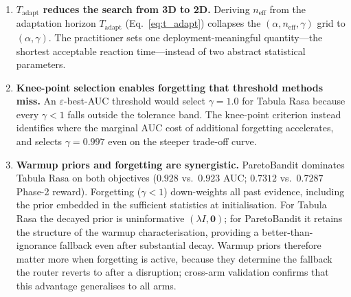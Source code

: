 \begin{enumerate}[nosep,leftmargin=*]
  \item \textbf{$T_{\text{adapt}}$ reduces the search from 3D to 2D.}
    Deriving $n_{\text{eff}}$ from the adaptation horizon
    $T_{\text{adapt}}$ (Eq.~\ref{eq:t_adapt}) collapses the
    $(\alpha, n_{\text{eff}}, \gamma)$ grid to
    $(\alpha, \gamma)$.  The practitioner sets one
    deployment-meaningful quantity---the shortest acceptable
    reaction time---instead of two abstract statistical parameters.

  \item \textbf{Knee-point selection enables forgetting that
    threshold methods miss.}
    An $\varepsilon$-best-AUC threshold would select
    $\gamma{=}1.0$ for Tabula Rasa because every $\gamma < 1$
    falls outside the tolerance band.  The knee-point criterion
    instead identifies where the marginal AUC cost of additional
    forgetting accelerates, and selects $\gamma{=}0.997$ even on
    the steeper trade-off curve.

  \item \textbf{Warmup priors and forgetting are synergistic.}
    ParetoBandit dominates Tabula Rasa on both objectives
    ($0.928$ vs.\ $0.923$ AUC; $0.7312$ vs.\ $0.7287$ Phase-2
    reward).
    Forgetting ($\gamma < 1$) down-weights all past evidence,
    including the prior embedded in the sufficient statistics at
    initialisation.
    For Tabula Rasa the decayed prior is uninformative
    $(\lambda I, \mathbf{0})$; for ParetoBandit it retains the
    structure of the warmup characterisation, providing a
    better-than-ignorance fallback even after substantial decay.
    Warmup priors therefore matter more when forgetting is active,
    because they determine the fallback the router reverts to after
    a disruption; cross-arm validation confirms that this advantage
    generalises to all arms.
\end{enumerate}
